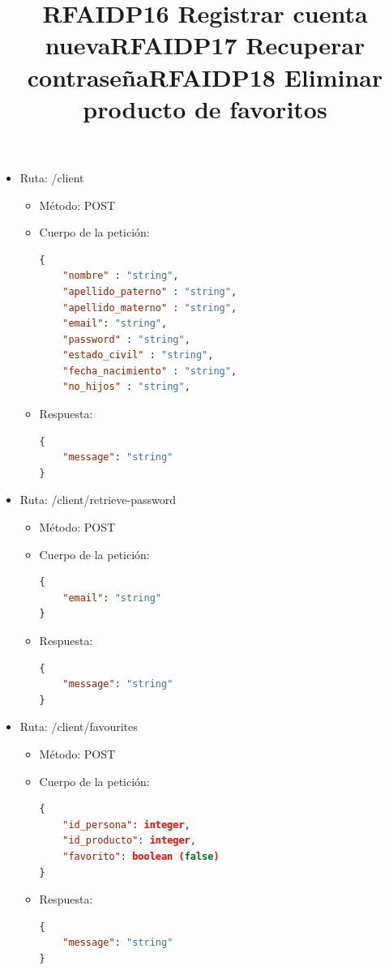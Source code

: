 \title{\textbf{RFAIDP16 Registrar cuenta nueva}}
\begin{itemize}
\item Ruta: /client
\begin{itemize}
\item Método: POST
\item Cuerpo de la petición:
\begin{lstlisting}[language=json,firstnumber=1]
{
    "nombre" : "string",
	"apellido_paterno" : "string",
	"apellido_materno" : "string",
	"email": "string", 
	"password" : "string",
	"estado_civil" : "string",
	"fecha_nacimiento" : "string", 
	"no_hijos" : "string",
\end{lstlisting}
\item Respuesta: 
\begin{lstlisting}[language=json,firstnumber=1]
{
    "message": "string"
}
\end{lstlisting}
\end{itemize}
\end{itemize}
\title{\textbf{RFAIDP17 Recuperar contraseña}}
\begin{itemize}
\item Ruta: /client/retrieve-password
\begin{itemize}
\item Método: POST
\item Cuerpo de la petición:
\begin{lstlisting}[language=json,firstnumber=1]
{
	"email": "string"
}
\end{lstlisting}
\item Respuesta: 
\begin{lstlisting}[language=json,firstnumber=1]
{
    "message": "string"
}
\end{lstlisting}
\end{itemize}
\end{itemize}
\title{\textbf{RFAIDP18 Eliminar producto de favoritos}}
\begin{itemize}
\item Ruta: /client/favourites
\begin{itemize}
\item Método: POST
\item Cuerpo de la petición:
\begin{lstlisting}[language=json,firstnumber=1]
{
	"id_persona": integer, 
	"id_producto": integer,
	"favorito": boolean (false)
}
\end{lstlisting}
\item Respuesta: 
\begin{lstlisting}[language=json,firstnumber=1]
{
    "message": "string"
}
\end{lstlisting}
\end{itemize}
\end{itemize}

